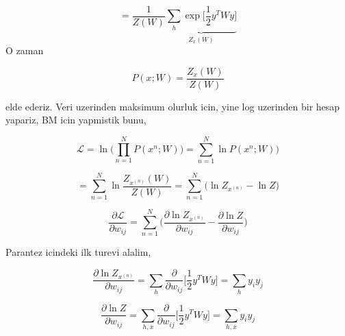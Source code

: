 \documentclass[12pt,fleqn]{article}\usepackage{../common}
\begin{document}
$$  
= \frac{1}{Z(W)}  
\underbrace{
\sum_h \exp 
\bigg[ 
\frac{1}{2} y^T W y
\bigg]
}_{Z_x(W)}
$$
O zaman 

$$  
P(x;W) = \frac{Z_x(W)}{Z(W)}  
$$

elde ederiz. Veri uzerinden maksimum olurluk icin, yine log uzerinden bir
hesap yapariz, BM icin yapmistik bunu,

$$  
\mathcal{L} = 
\ln \big( \prod_{n=1}^{N} P(x^{n};W) \big) = 
\sum_{n=1}^{N} \ln P(x^{n};W) \big) $$

$$ 
= \sum_{n=1}^{N} \ln \frac{Z_{x^{(n)}}(W)}{Z(W)}  
= \sum_{n=1}^{N}  \big(\ln Z_{x^{(n)}} - \ln Z \big)
 $$


$$ 
\frac{\partial \mathcal{L} }{\partial w_{ij}} = 
 \sum_{n=1}^{N}  \big( \frac{\partial \ln Z_{x^{(n)}} }{\partial w_{ij}}
- \frac{\partial \ln Z }{\partial w_{ij}} \big)
$$

Parantez icindeki ilk turevi alalim,


$$ 
\frac{\partial \ln Z_{x^{(n)}} }{\partial w_{ij}} =
\sum_h 
\frac{\partial }{\partial w_{ij}}
\big[ 
\frac{1}{2} y^T W y
\big] = \sum_h  y_iy_j
 $$


$$ 
\frac{\partial \ln Z }{\partial w_{ij}} =
\sum_{h,x}
\frac{\partial }{\partial w_{ij}}
\big[ 
\frac{1}{2} y^T W y
\big] = \sum_{h,x}  y_iy_j
 $$
\end{document}
